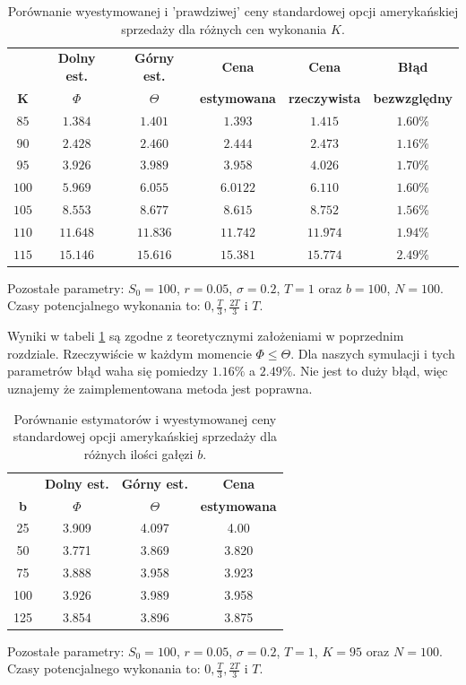 \documentclass[]{pwr_wmat_praca_dyplomowa}
\theoremstyle{plain}
\numberwithin{theorem}{chapter}
\theoremstyle{definition}
\numberwithin{theorem}{chapter}
\begin{document}
\begin{table}[h!]
\caption{Porównanie wyestymowanej i 'prawdziwej' ceny standardowej opcji amerykańskiej sprzedaży dla różnych cen wykonania $K$.}
\centering
\begin{tabular}{cccccc}
\hline                       
 & \textbf{Dolny est.} & \textbf{Górny est.} & \textbf{Cena} & \textbf{Cena}&\textbf{Błąd}\\
\textbf{K} & \textbf{$\Phi$} & \textbf{$\Theta$} & \textbf{estymowana} & \textbf{rzeczywista}&\textbf{bezwzględny}\\
\hline
$85$&$1.384$&$1.401$&$1.393$&$1.415$&$1.60$\%\\
$90$&$2.428$&$2.460$&$2.444$&$2.473$&$1.16$\%\\
$95$&$3.926$&$3.989$&$3.958$&$4.026$&$1.70$\%\\
$100$&$5.969$&$6.055$&$6.0122$&$6.110$&$1.60$\%\\
$105$&$8.553$&$8.677$&$8.615$&$8.752$&$1.56$\%\\
$110$&$11.648$&$11.836$&$11.742$&$11.974$&$1.94$\%\\
$115$&$15.146$&$15.616$&$15.381$&$15.774$&$2.49$\%\\
\hline 
\end{tabular}

Pozostałe parametry: $S_0 = 100$, $r=0.05$, $\sigma = 0.2$, $T=1$ oraz $b = 100$, $N = 100$.\\ Czasy potencjalnego wykonania to: $0,\frac{T}{3},\frac{2T}{3}$ i $T$.
\label{tab:wycena_am} 
\end{table}

\noindent Wyniki w tabeli \ref{tab:wycena_am} są zgodne z teoretycznymi założeniami w poprzednim rozdziale. Rzeczywiście w każdym momencie $\Phi \leq \Theta$. Dla naszych symulacji i tych parametrów błąd waha się pomiedzy $1.16\%$ a $2.49\%$. Nie jest to duży błąd, więc uznajemy że zaimplementowana metoda jest poprawna. 

\begin{table}[h!]
\caption{Porównanie estymatorów i wyestymowanej ceny standardowej opcji amerykańskiej sprzedaży dla różnych ilości gałęzi $b$.}
\centering
\begin{tabular}{cccc}
\hline                       
 & \textbf{Dolny est.} & \textbf{Górny est.} & \textbf{Cena}\\
\textbf{b} & \textbf{$\Phi$} & \textbf{$\Theta$} & \textbf{estymowana}\\
\hline
25&3.909&4.097&4.00\\
50&3.771&3.869&3.820\\
75&3.888&3.958&3.923\\
100&3.926&3.989&3.958\\
125&3.854&3.896&3.875\\
\hline 
\end{tabular}

Pozostałe parametry: $S_0 = 100$, $r=0.05$, $\sigma = 0.2$, $T=1$, $K = 95$ oraz $N = 100$. \\ Czasy potencjalnego wykonania to: $0,\frac{T}{3},\frac{2T}{3}$ i $T$.
\label{tab:wycena_am_b} 
\end{table}
\end{document}
